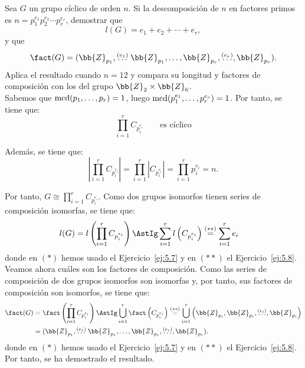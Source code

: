 \begin{ejercicio}\label{ej:5.9}
    Sea $G$ un grupo cíclico de orden $n$. Si la descomposición de $n$ en factores primos es $n = p_1^{e_1} p_2^{e_2} \cdots p_r^{e_r}$, demostrar que
    \[
        l(G) = e_1 + e_2 + \cdots + e_r,
    \]
    y que
    \[
        \fact(G) = (\bb{Z}_{p_1}, \stackrel{(e_1)}{\ldots}\bb{Z}_{p_1}, \dots, \bb{Z}_{p_r},\stackrel{(e_r)}{\ldots}, \bb{Z}_{p_r}).
    \]
    Aplica el resultado cuando $n = 12$ y compara su longitud y factores de composición con los del grupo $\bb{Z}_2 \times \bb{Z}_6$.\\

    Sabemos que $\operatorname{mcd}(p_1,\dots,p_r)=1$, luego $\operatorname{mcd}(p_1^{e_1},\dots,p_r^{e_r})=1$. Por tanto, se tiene que:
    \begin{equation*}
        \prod_{i=1}^{r} C_{p_i^{e_i}}\qquad \text{es cíclico}
    \end{equation*}

    Además, se tiene que:
    \begin{equation*}
        \left|\prod_{i=1}^{r} C_{p_i^{e_i}}\right| = \prod_{i=1}^{r} |C_{p_i^{e_i}}| = \prod_{i=1}^{r} p_i^{e_i} = n.
    \end{equation*}

    Por tanto, $G\cong \prod\limits_{i=1}^{r} C_{p_i^{e_i}}$. Como dos grupos isomorfos tienen series de composición isomorfas, se tiene que:
    \begin{align*}
        l(G) &= l\left(\prod_{i=1}^{r} C_{p_i^{e_i}}\right) 
        \AstIg \sum_{i=1}^{r} l\left(C_{p_i^{e_i}}\right) 
        \stackrel{(\ast\ast)}{=} \sum_{i=1}^{r} e_i
    \end{align*}
    donde en $(\ast)$ hemos usado el Ejercicio~\ref{ej:5.7} y en $(\ast\ast)$ el Ejercicio~\ref{ej:5.8}.\\

    Veamos ahora cuáles son los factores de composición. Como las series de composición de dos grupos isomorfos son isomorfas y, por tanto, sus factores de composición son isomorfos, se tiene que:
    \begin{align*}
        \fact(G) &= \fact\left(\prod_{i=1}^{r} C_{p_i^{e_i}}\right) 
        \AstIg \bigcup_{i=1}^{r} \fact\left(C_{p_i^{e_i}}\right) 
        \stackrel{(\ast\ast)}{=} \bigcup_{i=1}^{r} \left(\bb{Z}_{p_i}, \bb{Z}_{p_i}, \stackrel{(e_i)}{\ldots}, \bb{Z}_{p_i}\right)\\
        &= (\bb{Z}_{p_1}, \stackrel{(e_1)}{\ldots}\bb{Z}_{p_1}, \dots, \bb{Z}_{p_r},\stackrel{(e_r)}{\ldots}, \bb{Z}_{p_r}).
    \end{align*}
    donde en $(\ast)$ hemos usado el Ejercicio~\ref{ej:5.7} y en $(\ast\ast)$ el Ejercicio~\ref{ej:5.8}. Por tanto, se ha demostrado el resultado.\\


\end{ejercicio}
